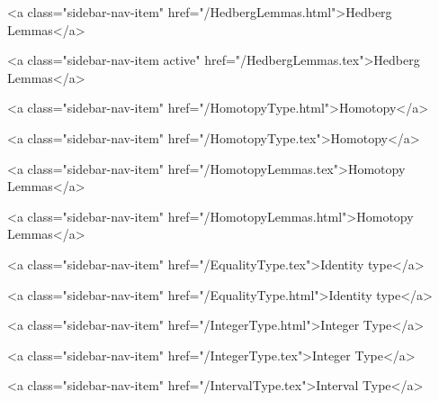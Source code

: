       
    
      
        
          <a class="sidebar-nav-item" href="/HedbergLemmas.html">Hedberg Lemmas</a>
        
      
    
      
        
          <a class="sidebar-nav-item active" href="/HedbergLemmas.tex">Hedberg Lemmas</a>
        
      
    
      
        
          <a class="sidebar-nav-item" href="/HomotopyType.html">Homotopy</a>
        
      
    
      
        
          <a class="sidebar-nav-item" href="/HomotopyType.tex">Homotopy</a>
        
      
    
      
        
          <a class="sidebar-nav-item" href="/HomotopyLemmas.tex">Homotopy Lemmas</a>
        
      
    
      
        
          <a class="sidebar-nav-item" href="/HomotopyLemmas.html">Homotopy Lemmas</a>
        
      
    
      
        
          <a class="sidebar-nav-item" href="/EqualityType.tex">Identity type</a>
        
      
    
      
        
          <a class="sidebar-nav-item" href="/EqualityType.html">Identity type</a>
        
      
    
      
        
          <a class="sidebar-nav-item" href="/IntegerType.html">Integer Type</a>
        
      
    
      
        
          <a class="sidebar-nav-item" href="/IntegerType.tex">Integer Type</a>
        
      
    
      
        
          <a class="sidebar-nav-item" href="/IntervalType.tex">Interval Type</a>
        
